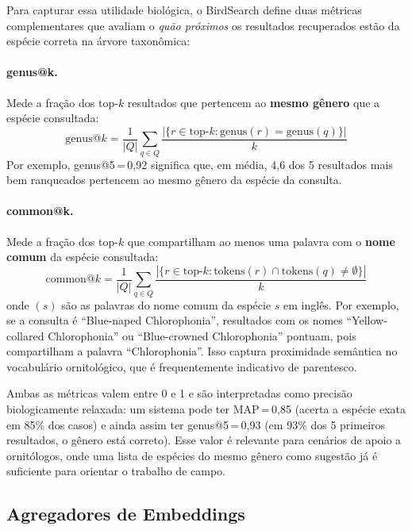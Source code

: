 \documentclass[12pt]{article}
\begin{document}
Para capturar essa utilidade biológica, o BirdSearch define duas métricas
complementares que avaliam o \emph{quão próximos} os resultados recuperados
estão da espécie correta na árvore taxonômica:

\paragraph{genus@k.} Mede a fração dos top-$k$ resultados que pertencem ao
\textbf{mesmo gênero} que a espécie consultada:
\begin{equation}
  \text{genus@}k = \frac{1}{|Q|}\sum_{q\in Q}
  \frac{|\{r \in \text{top-}k : \text{genus}(r) = \text{genus}(q)\}|}{k}
  \label{eq:genus}
\end{equation}
Por exemplo, genus@5\,=\,0,92 significa que, em média, 4,6 dos 5 resultados
mais bem ranqueados pertencem ao mesmo gênero da espécie da consulta.

\paragraph{common@k.} Mede a fração dos top-$k$ que compartilham ao menos
uma palavra com o \textbf{nome comum} da espécie consultada:
\begin{equation}
  \text{common@}k = \frac{1}{|Q|}\sum_{q\in Q}
  \frac{|\{r \in \text{top-}k : \text{tokens}(r) \cap \text{tokens}(q) \neq \emptyset\}|}{k}
  \label{eq:common}
\end{equation}
onde $(s)$ são as palavras do nome comum da espécie $s$ em inglês.
Por exemplo, se a consulta é ``Blue-naped Chlorophonia'', resultados com os
nomes ``Yellow-collared Chlorophonia'' ou ``Blue-crowned Chlorophonia'' pontuam,
pois compartilham a palavra ``Chlorophonia''. Isso captura proximidade semântica
no vocabulário ornitológico, que é frequentemente indicativo de parentesco.

Ambas as métricas valem entre 0 e 1 e são interpretadas como precisão
biologicamente relaxada: um sistema pode ter MAP\,=\,0,85 (acerta a espécie
exata em 85\% dos casos) e ainda assim ter genus@5\,=\,0,93 (em 93\% dos 5
primeiros resultados, o gênero está correto). Esse valor é relevante para
cenários de apoio a ornitólogos, onde uma lista de espécies do mesmo gênero
como sugestão já é suficiente para orientar o trabalho de campo.

\subsection{Agregadores de Embeddings}
\end{document}
